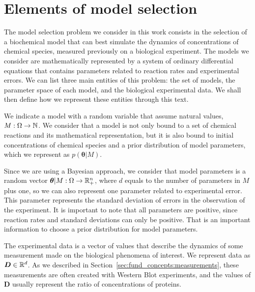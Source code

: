 \section{Elements of model selection}
The model selection problem we consider in this work consists in the
selection of a biochemical model that can best simulate the dynamics 
of concentrations of chemical species, measured previously on a 
biological experiment. The models we consider are mathematically 
represented by a system of ordinary differential equations that
contains parameters related to reaction rates and experimental errors.
We can list three main entities of this problem: the set of models, the 
parameter space of each model, and the biological experimental data.
We shall then define how we represent these entities through this text.

We indicate a model with a random variable that assume natural values, 
$M: \Omega \to \mathbb{N}$. We consider that a model is not only bound to
a set of chemical reactions and its mathematical representation, but 
it is also bound to initial concentrations of chemical species and a
prior distribution of model parameters, which we represent as $p({\bm
\theta} | M)$.

Since we are using a Bayesian approach, we consider that model
parameters is a random vector ${\bm\theta} | M: \Omega \to \mathbb{R}^{n}_+$,
where $d$ equals to the number of parameters in $M$ plus one, so we can
also represent one parameter related to experimental error. This
parameter represents the standard deviation of errors in the observation
of the experiment. It is important to note that all parameters are
positive, since reaction rates and standard deviations can only be
positive. That is an important information to choose a prior
distribution for model parameters.

The experimental data is a vector of values that describe the dynamics
of some measurement made on the biological phenomena of interest. We
represent data as ${\bm D} \in \mathbb{R}^{d}$. As we described in
Section~\ref{sec:fund_concepts:measurements}, these measurements are
often created with Western Blot experiments, and the values of ${\bm D}$
usually represent the ratio of concentrations of proteins.


